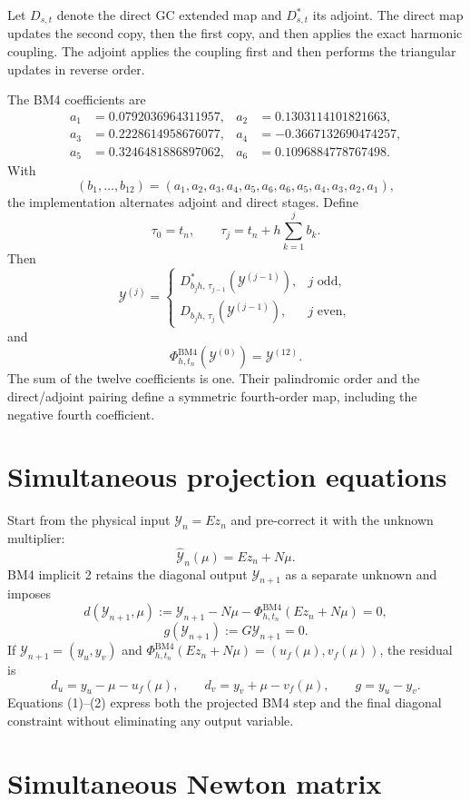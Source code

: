 \documentclass[11pt,a4paper]{article}
\newcommand{\Y}{\mathcal{Y}}
\newcommand{\PhiBM}{\Phi^{\mathrm{BM4}}_{h,t_n}}
\begin{document}
Let $D_{s,t}$ denote the direct GC extended map and $D^*_{s,t}$ its
adjoint.  The direct map updates the second copy, then the first copy, and then
applies the exact harmonic coupling.  The adjoint applies the coupling first and
then performs the triangular updates in reverse order.

The BM4 coefficients are
\[
\begin{aligned}
 a_1&= 0.0792036964311957,&
 a_2&= 0.1303114101821663,\\
 a_3&= 0.2228614958676077,&
 a_4&=-0.3667132690474257,\\
 a_5&= 0.3246481886897062,&
 a_6&= 0.1096884778767498.
\end{aligned}
\]
With
\[
 (b_1,\ldots,b_{12})
 =(a_1,a_2,a_3,a_4,a_5,a_6,a_6,a_5,a_4,a_3,a_2,a_1),
\]
the implementation alternates adjoint and direct stages.  Define
\[
 \tau_0=t_n,
 \qquad
 \tau_j=t_n+h\sum_{k=1}^j b_k.
\]
Then
\[
 \Y^{(j)}=
 \begin{cases}
  D^*_{b_jh,\,\tau_{j-1}}(\Y^{(j-1)}),&j\text{ odd},\\
  D_{b_jh,\,\tau_j}(\Y^{(j-1)}),&j\text{ even},
 \end{cases}
\]
and
\[
 \boxed{\PhiBM(\Y^{(0)})=\Y^{(12)}.}
\]
The sum of the twelve coefficients is one.  Their palindromic order and the
direct/adjoint pairing define a symmetric fourth-order map, including the
negative fourth coefficient.

\section{Simultaneous projection equations}

Start from the physical input $\Y_n=Ez_n$ and pre-correct it with the unknown
multiplier:
\[
 \widehat{\Y}_n(\mu)=Ez_n+N\mu.
\]
BM4 implicit 2 retains the diagonal output $\Y_{n+1}$ as a separate unknown and
imposes
\[
 d(\Y_{n+1},\mu)
 :=\Y_{n+1}-N\mu-\PhiBM(Ez_n+N\mu)=0, \tag{1}
\]
\[
 g(\Y_{n+1}):=G\Y_{n+1}=0. \tag{2}
\]
If $\Y_{n+1}=(y_u,y_v)$ and
$\PhiBM(Ez_n+N\mu)=(u_f(\mu),v_f(\mu))$, the residual is
\[
 d_u=y_u-\mu-u_f(\mu),
 \qquad
 d_v=y_v+\mu-v_f(\mu),
 \qquad
 g=y_u-y_v.
\]
Equations (1)--(2) express both the projected BM4 step and the final diagonal
constraint without eliminating any output variable.

\section{Simultaneous Newton matrix}
\end{document}
